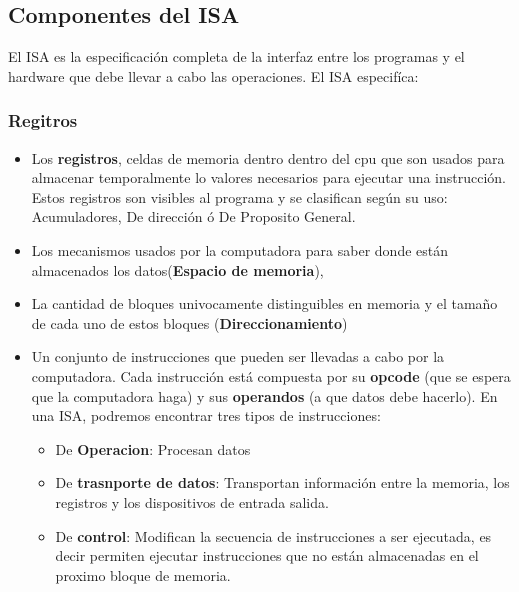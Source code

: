 \subsection{Componentes del ISA}
El ISA es la especificación completa de la interfaz entre los programas y el hardware que debe llevar a cabo las operaciones. El ISA especifíca:

\subsubsection{Regitros}
\begin{itemize}
	\item Los \textbf{registros},  celdas de memoria dentro dentro del cpu que son usados para almacenar temporalmente lo valores necesarios para ejecutar una instrucción. Estos registros son visibles al programa y se clasifican según su uso: Acumuladores, De dirección ó De Proposito General.
	\item Los mecanismos usados por la computadora para saber donde están almacenados los datos(\textbf{Espacio de memoria}), 
	\item La cantidad de bloques univocamente distinguibles en memoria y el tamaño de cada uno de estos bloques (\textbf{Direccionamiento})
	\item  Un conjunto de instrucciones  que pueden ser llevadas a cabo por la computadora. Cada instrucción está compuesta por su \textbf{opcode} (que se espera que la computadora haga) y sus \textbf{operandos} (a que datos debe hacerlo). En una ISA, podremos encontrar tres tipos de instrucciones:
	\begin{itemize}
		\item De \textbf{Operacion}: Procesan datos
		\item De \textbf{trasnporte de datos}: Transportan información entre la memoria, los registros y los dispositivos de entrada salida.
		\item De \textbf{control}: Modifican la secuencia de instrucciones a ser ejecutada, es decir permiten ejecutar instrucciones que no están almacenadas en el proximo bloque de memoria.
	\end{itemize}
	

\end{itemize}
